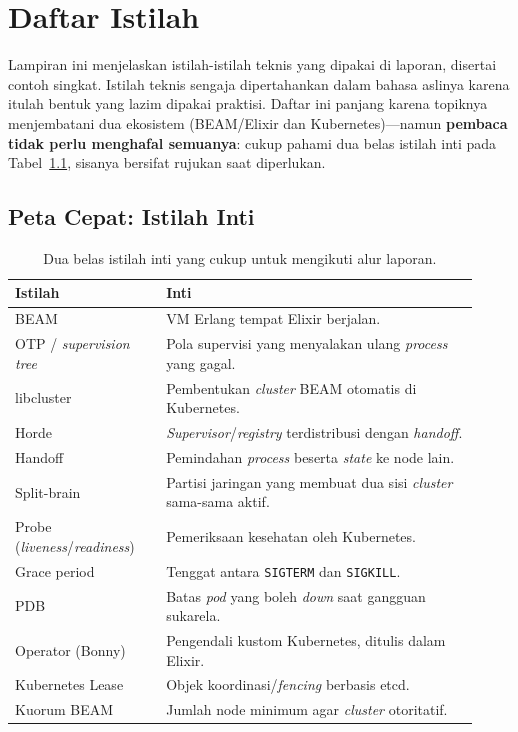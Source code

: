 \chapter{Daftar Istilah}
\label{ch:glosarium}

Lampiran ini menjelaskan istilah-istilah teknis yang dipakai di laporan, disertai
contoh singkat. Istilah teknis sengaja dipertahankan dalam bahasa aslinya karena itulah
bentuk yang lazim dipakai praktisi. Daftar ini panjang karena topiknya menjembatani dua
ekosistem (BEAM/Elixir dan Kubernetes)---namun \textbf{pembaca tidak perlu menghafal
semuanya}: cukup pahami dua belas istilah inti pada Tabel~\ref{tab:inti}, sisanya bersifat
rujukan saat diperlukan.

\section*{Peta Cepat: Istilah Inti}
\begin{table}[H]\centering\small
\caption{Dua belas istilah inti yang cukup untuk mengikuti alur laporan.}
\label{tab:inti}
\begin{tabular}{@{}p{0.30\linewidth}p{0.62\linewidth}@{}}
\toprule
\textbf{Istilah} & \textbf{Inti} \\
\midrule
BEAM & VM Erlang tempat Elixir berjalan. \\
OTP / \emph{supervision tree} & Pola supervisi yang menyalakan ulang \emph{process} yang gagal. \\
libcluster & Pembentukan \emph{cluster} BEAM otomatis di Kubernetes. \\
Horde & \emph{Supervisor}/\emph{registry} terdistribusi dengan \emph{handoff}. \\
Handoff & Pemindahan \emph{process} beserta \emph{state} ke node lain. \\
Split-brain & Partisi jaringan yang membuat dua sisi \emph{cluster} sama-sama aktif. \\
Probe (\emph{liveness}/\emph{readiness}) & Pemeriksaan kesehatan oleh Kubernetes. \\
Grace period & Tenggat antara \texttt{SIGTERM} dan \texttt{SIGKILL}. \\
PDB & Batas \emph{pod} yang boleh \emph{down} saat gangguan sukarela. \\
Operator (Bonny) & Pengendali kustom Kubernetes, ditulis dalam Elixir. \\
Kubernetes Lease & Objek koordinasi/\emph{fencing} berbasis etcd. \\
Kuorum BEAM & Jumlah node minimum agar \emph{cluster} otoritatif. \\
\bottomrule
\end{tabular}
\end{table}

